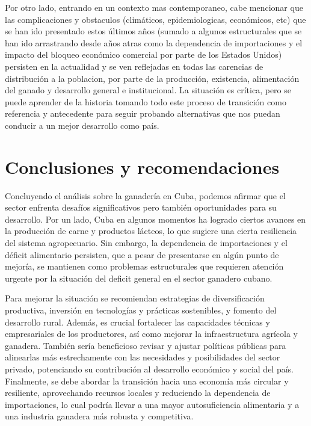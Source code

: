 \documentclass{article}
\begin{document}
Por otro lado, entrando en un contexto mas contemporaneo, cabe mencionar que las complicaciones y obstaculos (climáticos, epidemiologicas, económicos, etc) que se han ido presentado estos últimos años (sumado a algunos estructurales que se han ido arrastrando desde años atras como la dependencia de importaciones y el impacto 
del bloqueo económico comercial por parte de los Estados Unidos) persisten en la actualidad y se ven reflejadas en todas las carencias de distribución a la poblacion, por parte de la producción, existencia, alimentación del ganado y desarrollo general e institucional. La situación es crítica, pero se puede aprender de la historia
tomando todo este proceso de transición como referencia y antecedente para seguir probando alternativas que nos puedan conducir a un mejor desarrollo como país.

\section{Conclusiones y recomendaciones}
Concluyendo el análisis sobre la ganadería en Cuba, podemos afirmar que el sector enfrenta desafíos significativos pero también oportunidades para su desarrollo. Por un lado, Cuba en algunos momentos ha logrado ciertos avances en la producción de carne y productos lácteos, lo que sugiere una cierta 
resiliencia del sistema agropecuario. Sin embargo, la dependencia de importaciones y el déficit alimentario persisten, que a pesar de presentarse en algún punto de mejoría, se mantienen como problemas estructurales que requieren atención urgente por la situación del deficit general en el sector ganadero cubano.

Para mejorar la situación se recomiendan estrategias de diversificación productiva, inversión en tecnologías y prácticas sostenibles, y fomento del desarrollo rural. Además, es crucial fortalecer las capacidades técnicas y empresariales de los productores, 
así como mejorar la infraestructura agrícola y ganadera. También sería beneficioso revisar y ajustar políticas públicas para alinearlas más estrechamente con las necesidades y posibilidades del sector privado, potenciando su contribución al desarrollo económico y social del país. 
Finalmente, se debe abordar la transición hacia una economía más circular y resiliente, aprovechando recursos locales y reduciendo la dependencia de importaciones, lo cual podría llevar a una mayor autosuficiencia alimentaria y a una industria ganadera más robusta y competitiva.
\end{document}
